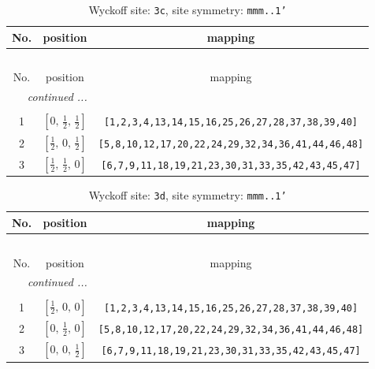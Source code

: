 \documentclass[fleqn,8pt]{jsarticle}
\begin{document}
\renewcommand{\arraystretch}{1.2}
\begin{longtable}{ccc}
\caption{Wyckoff site: {\tt 3c}, site symmetry: {\tt mmm..1'}}
 \\
 \hline \hline
No. & position & mapping \\ \hline \endfirsthead

\multicolumn{2}{l}{\tablename\ \thetable{}} \\
 \hline \hline
No. & position & mapping \\ \hline \endhead

 \hline \hline
\multicolumn{2}{r}{\footnotesize\it continued ...} \\ \endfoot

 \hline \hline
\multicolumn{2}{r}{} \\ \endlastfoot

1 & $\left[ 0,\, \frac{1}{2},\, \frac{1}{2} \right]$ & {\tt [1,2,3,4,13,14,15,16,25,26,27,28,37,38,39,40]} \\ \hline
2 & $\left[ \frac{1}{2},\, 0,\, \frac{1}{2} \right]$ & {\tt [5,8,10,12,17,20,22,24,29,32,34,36,41,44,46,48]} \\ \hline
3 & $\left[ \frac{1}{2},\, \frac{1}{2},\, 0 \right]$ & {\tt [6,7,9,11,18,19,21,23,30,31,33,35,42,43,45,47]} \\
\end{longtable}
\renewcommand{\arraystretch}{1.2}
\begin{longtable}{ccc}
\caption{Wyckoff site: {\tt 3d}, site symmetry: {\tt mmm..1'}}
 \\
 \hline \hline
No. & position & mapping \\ \hline \endfirsthead

\multicolumn{2}{l}{\tablename\ \thetable{}} \\
 \hline \hline
No. & position & mapping \\ \hline \endhead

 \hline \hline
\multicolumn{2}{r}{\footnotesize\it continued ...} \\ \endfoot

 \hline \hline
\multicolumn{2}{r}{} \\ \endlastfoot

1 & $\left[ \frac{1}{2},\, 0,\, 0 \right]$ & {\tt [1,2,3,4,13,14,15,16,25,26,27,28,37,38,39,40]} \\ \hline
2 & $\left[ 0,\, \frac{1}{2},\, 0 \right]$ & {\tt [5,8,10,12,17,20,22,24,29,32,34,36,41,44,46,48]} \\ \hline
3 & $\left[ 0,\, 0,\, \frac{1}{2} \right]$ & {\tt [6,7,9,11,18,19,21,23,30,31,33,35,42,43,45,47]} \\
\end{longtable}
\end{document}
